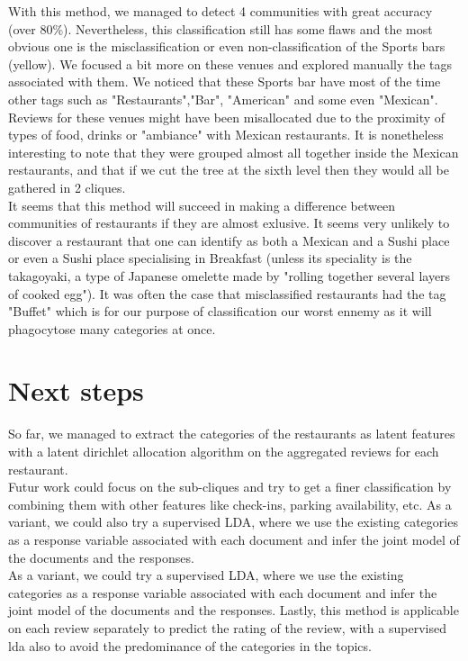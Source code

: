 \documentclass[twoside]{article}
\begin{document}
\begin{multicols}{2}
\noindent With this method, we managed to detect 4 communities with great accuracy (over 80\%). Nevertheless, this classification still has some flaws and the most obvious one is the misclassification or even non-classification of the Sports bars (yellow). We focused a bit more on these venues and explored manually the tags associated with them. We noticed that these Sports bar have most of the time other tags such as "Restaurants","Bar", "American" and some even "Mexican". Reviews for these venues might have been misallocated due to the proximity of types of food, drinks or "ambiance" with Mexican restaurants. It is nonetheless interesting to note that they were grouped almost all together inside the Mexican restaurants, and that if we cut the tree at the sixth level then they would all be gathered in 2 cliques.\\

\noindent It seems that this method will succeed in making a difference between communities of restaurants if they are almost exlusive. It seems very unlikely to discover a restaurant that one can identify as both a Mexican and a Sushi place or even a Sushi place specialising in Breakfast (unless its speciality is the takagoyaki, a type of Japanese omelette made by "rolling together several layers of cooked egg"). It was often the case that misclassified restaurants had the tag "Buffet" which is for our purpose of classification our worst ennemy as it will phagocytose many categories at once.

\section{Next steps}

So far, we managed to extract the categories of the restaurants as latent features with a latent dirichlet allocation algorithm on the aggregated reviews for each restaurant. \\

Futur work could focus on the sub-cliques and try to get a finer classification by combining them with other features like check-ins, parking availability, etc. As a variant, we could also try a supervised LDA, where we use the existing categories as a response variable associated with each document and infer the joint model of the documents and the responses.\\

As a variant, we could try a supervised LDA, where we use the existing categories as a response variable associated with each document and infer the joint model of the documents and the responses. Lastly, this method is applicable on each review separately to predict the rating of the review, with a supervised lda also to avoid the predominance of the categories in the topics.



\end{multicols}
\end{document}
